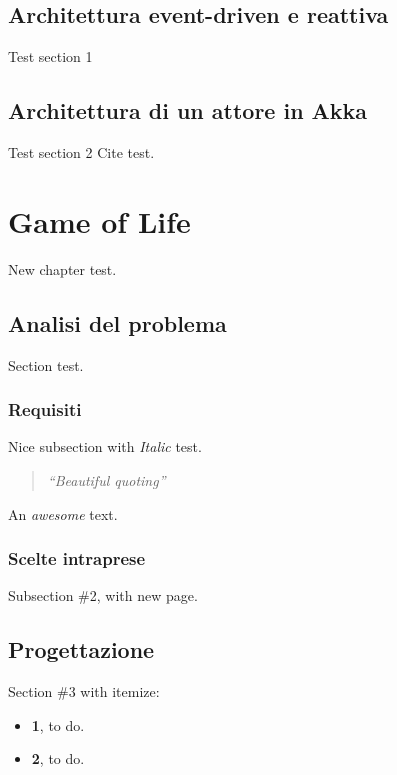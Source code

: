 \documentclass[12pt,a4paper,openright,oneside]{report}
\newcommand{\quotes}[1]{``#1''}
\begin{document}
	\section{Architettura event-driven e reattiva}
	Test section 1
	\begin{comment}
	\begin{figure}[!htb]
	\centering
	\texttt{[image: eps/akka\_system\_working.pdf]}
	\caption{Schema di funzionamento di un sistema Akka}
	\label{fig:akka_system_working}
	\end{figure}
	\end{comment}
	
	\section{Architettura di un attore in Akka}
	Test section 2
	\vspace{0,5cm}
	Cite test\cite{AkkaSiteWeb}.\\
	\clearpage{\pagestyle{empty}\cleardoublepage}
	\chapter{Game of Life}           %
	\lhead[\fancyplain{}{\bfseries\thepage}]{\fancyplain{}{\bfseries\rightmark}}
	New chapter test.
	\section{Analisi del problema}						%
	Section test.
	
	\subsection{Requisiti}
	\label{subsec:GameOfLifeRequisiti}
	Nice subsection with \textit{Italic} test.
	\begin{quote}
		\textit{\quotes{Beautiful quoting}}
	\end{quote}
	An \emph{awesome} text.
	
	\subsection{Scelte intraprese}
	Subsection \#2, with new page.
	\newpage
	\section{Progettazione}						%
	Section \#3 with itemize:
	\begin{itemize}
		\item \textbf{1}, to do.
		\item \textbf{2}, to do.
	\end{itemize}
	
\end{document}
